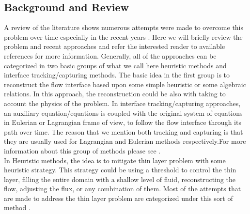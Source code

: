 \documentclass[letterpaper,10pt]{article}
\begin{document}
\subsection{Background and Review}
A review of the literature shows numerous attempts were made to overcome this problem over time especially in the recent years \cite{Medeiros2013,Balzano1998,Aureli2008,Bunya2009,Casulli2009a,
Kesserwani2011,DAlpaos2007,Castro2005a}.
Here we will briefly review the problem and recent approaches and refer the interested reader to available references for more information.
Generally, all of the approaches can be 
categorized in two basic groups of what we call here heuristic methods and interface tracking/capturing methods.
The basic idea in the first group is to reconstruct the flow interface based upon 
some simple heuristic or some algebraic relations. In this approach, the reconstruction could be also with taking to account the physics of the problem. In interface tracking/capturing approaches, 
an auxiliary equation/equations is coupled with the original system of equations in Eulerian or Lagrangian frame of view, to follow the flow interface through its path over time. 
The reason that we mention both tracking and capturing is that they are usually used for Lagrangian and Eulerian methods respectively.For more information about this group of methods please 
see \cite{Glimm1995,Unverdi1992,Osher1988,Anderson1998,hirt1981vfv}.\\


In Heuristic methods, the idea is to mitigate thin layer problem with some heuristic strategy. This strategy could be using a threshold to control the thin layer, filling the entire domain with a 
shallow level of fluid, reconstructing the flow, adjusting the flux, or any combination of them. Most of the attempts that are made to address the thin layer problem are categorized under this sort of method \cite{Aureli2008,Bunya2009,Castro2005a,Kesserwani2011}.
\end{document}
